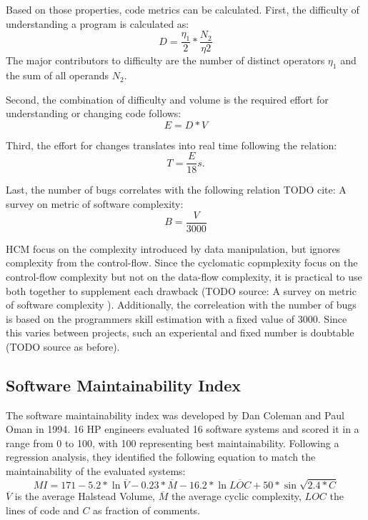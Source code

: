Based on those properties, code metrics can be calculated. 
First, the difficulty of understanding a program is calculated as:
\begin{displaymath}
    D = \frac{\eta_1}{2} * \frac{N_2}{\eta2}
\end{displaymath}
The major contributors to difficulty are the number of distinct operators $\eta_1$ and the sum of all operands $N_2$.

Second, the combination of difficulty and volume is the required effort for understanding or changing code follows:
\begin{displaymath}
    E = D * V
\end{displaymath}

Third, the effort for changes translates into real time following the relation:
\begin{displaymath}
    T = \frac{E}{18}s.
\end{displaymath}

Last, the number of bugs correlates with the following relation TODO cite: A survey on metric of software complexity:
\begin{displaymath}
    B = \frac{V}{3000}
\end{displaymath}

HCM focus on the complexity introduced by data manipulation, but ignores complexity from the control-flow. Since the cyclomatic copmplexity focus on the control-flow complexity but not on the data-flow complexity, it is practical to use both together to supplement each drawback (TODO source: A survey on metric of software complexity
). Additionally, the correleation with the number of bugs is based on the programmers skill estimation with a fixed value of 3000. Since this varies between projects, such an experiental and fixed number is doubtable (TODO source as before).

\subsection{Software Maintainability Index}
The software maintainability index was developed by Dan Coleman and Paul Oman in 1994. 16 HP engineers evaluated 16 software systems and scored it in a range from 0 to 100, with 100 representing best maintainability\cite{coleman_using_1994}. 
Following a regression analysis, they identified the following equation to match the maintainability of the evaluated systems:
\begin{displaymath}
MI = 171 - 5.2 *\ln{\overline{V}} - 0.23 * \overline{M} - 16.2 * \ln{\overline{LOC}} + 50 * \sin{\sqrt{2.4 * C}}
\end{displaymath}
$\overline{V}$ is the average Halstead Volume, $\overline{M}$ the average cyclic complexity, $LOC$ the lines of code and $C$ as fraction of comments.

